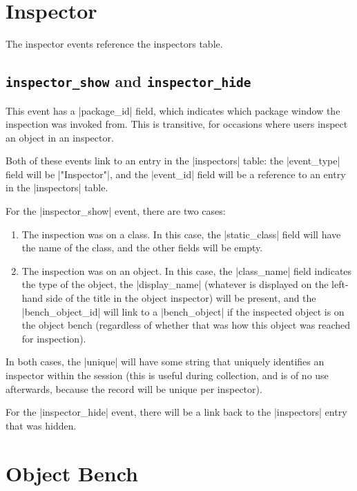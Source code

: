 \documentclass{book}
\begin{document}
\section{Inspector}

The inspector events reference the inspectors table.


\subsection{\lstinline|inspector_show| and \lstinline|inspector_hide|}

This event has a |package_id| field, which indicates which package window the
inspection was invoked from.  This is transitive, for occasions where users
inspect an object in an inspector.

Both of these events link to an entry in the |inspectors| table: the
|event_type| field will be |"Inspector"|, and the |event_id| field will be a
reference to an entry in the |inspectors| table.

For the |inspector_show| event, there are two cases:

\begin{enumerate}
\item The inspection was on a class.  In this case, the |static_class| field
  will have the name of the class, and the other fields will be empty.
\item The inspection was on an object.  In this case, the |class_name| field
  indicates the type of the object, the |display_name| (whatever is displayed
  on the left-hand side of the title in the object inspector) will be present,
  and the |bench_object_id| will link to a |bench_object| if the inspected
  object is on the object bench (regardless of whether that was how this
  object was reached for inspection).
\end{enumerate}

In both cases, the |unique| will have some string that uniquely identifies an
inspector within the session (this is useful during collection, and is of no
use afterwards, because the record will be unique per inspector).

For the |inspector_hide| event, there will be a link back to the |inspectors|
entry that was hidden.

\section{Object Bench}
\end{document}
